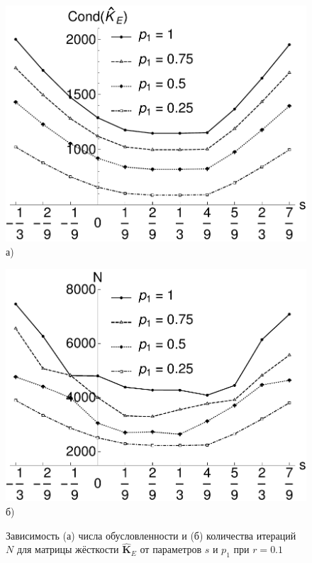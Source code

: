 \begin{figure}[ht]
    \begin{minipage}[b][][b]{0.4\linewidth}\centering
        \includegraphics[width=\linewidth]{pics/MechanicalCond.pdf} \\ а)
    \end{minipage}
    \hfill
    \begin{minipage}[b][][b]{0.4\linewidth}\centering
        \includegraphics[width=\linewidth]{pics/MechanicalIter.pdf} \\ б)
    \end{minipage}
    \caption{Зависимость (а) числа обусловленности и (б) количества итераций $N$ для матрицы жёсткости $\widehat{\textbf{K}}_E$ от параметров $s$ и $p_1$ при $r = 0.1$}
    \label{fig:MechanicalCondAndIter}
\end{figure}

